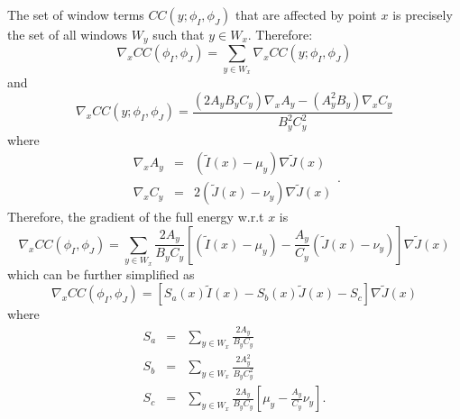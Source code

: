 The set of window terms $CC(y;\phi_{I}, \phi_{J})$
that are affected by point $x$ is precisely the set of all windows $W_{y}$ such that $y \in W_{x}$. Therefore:
\begin{equation}
    \nabla_{x} CC(\phi_{I}, \phi_{J}) = \sum_{y \in W_{x}} \nabla_{x} CC(y; \phi_{I}, \phi_{J})
\end{equation}
and
\begin{equation}
    \nabla_{x} CC(y; \phi_{I}, \phi_{J}) = \frac{\left(2A_{y} B_{y}C_{y}\right)\nabla_{x}A_{y} - \left(A_{y}^{2}B_{y}\right)\nabla_{x}C_{y}}
                                                {B_{y}^{2} C_{y}^{2}}
\end{equation}
where
\begin{equation}
    \begin{array}{lll}
    \nabla_{x}A_{y} &=& (\tilde{I}(x) - \mu_{y})\nabla \tilde{J}(x)\\
    \nabla_{x}C_{y} &=& 2(\tilde{J}(x) - \nu_{y})\nabla \tilde{J}(x)
    \end{array}.
\end{equation}
Therefore, the gradient of the full energy w.r.t $x$ is
\begin{equation}
    \nabla_{x} CC(\phi_{I}, \phi_{J}) = \sum_{y \in W_{x}} \frac{2A_{y}}{B_{y}C_{y}}\left[ (\tilde{I}(x) - \mu_{y}) - \frac{A_{y}}{C_{y}}\left(\tilde{J}(x) - \nu_{y}\right)\right]\nabla \tilde{J}(x)
\end{equation}
which can be further simplified as
\begin{equation}
    \nabla_{x} CC(\phi_{I}, \phi_{J}) = \left[S_{a}(x) \tilde{I}(x) - S_{b}(x)\tilde{J}(x) - S_{c}\right]\nabla \tilde{J}(x)
\end{equation}
where
\begin{equation}
    \begin{array}{lll}
        S_{a} &=& \sum_{y \in W_{x}} \frac{2A_{y}}{B_{y}C_{y}}\\
        S_{b} &=& \sum_{y \in W_{x}} \frac{2A_{y}^{2}}{B_{y}C_{y}^{2}}\\
        S_{c} &=& \sum_{y \in W_{x}} \frac{2A_{y}}{B_{y}C_{y}} \left[ \mu_{y} - \frac{A_{y}}{C_{y}}\nu_{y}\right].
    \end{array}
\end{equation}


